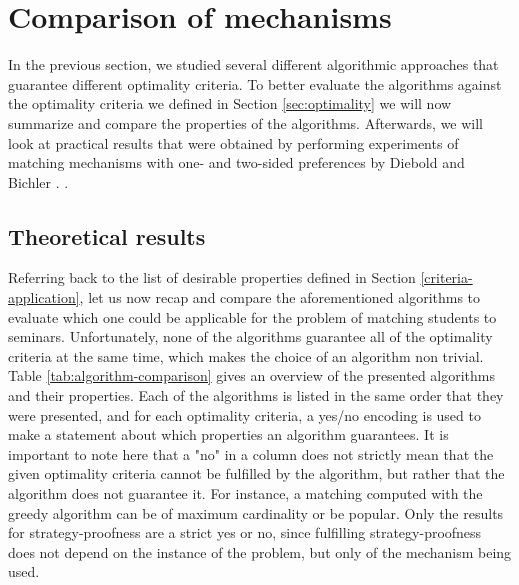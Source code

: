 \section{Comparison of mechanisms}
In the previous section, we studied several different algorithmic approaches that guarantee different optimality criteria. To better evaluate the algorithms against the optimality criteria we defined in Section \ref{sec:optimality} we will now summarize and compare the properties of the algorithms. Afterwards, we will look at practical results that were obtained by performing experiments of matching mechanisms with one- and two-sided preferences by Diebold and Bichler \cite{DieboldBenchmark}. .

\subsection{Theoretical results}
Referring back to the list of desirable properties defined in Section \ref{criteria-application}, let us now recap and compare the aforementioned algorithms to evaluate which one could be applicable for the problem of matching students to seminars. Unfortunately, none of the algorithms guarantee all of the optimality criteria at the same time, which makes the choice of an algorithm non trivial. Table \ref{tab:algorithm-comparison} gives an overview of the presented algorithms and their properties. Each of the algorithms is listed in the same order that they were presented, and for each optimality criteria, a yes/no encoding is used to make a statement about which properties an algorithm guarantees. It is important to note here that a "no" in a column does not strictly mean that the given optimality criteria cannot be fulfilled by the algorithm, but rather that the algorithm does not guarantee it. For instance, a matching computed with the greedy algorithm can be of maximum cardinality or be popular. Only the results for strategy-proofness are a strict yes or no, since fulfilling strategy-proofness does not depend on the instance of the problem, but only of the mechanism being used. 

